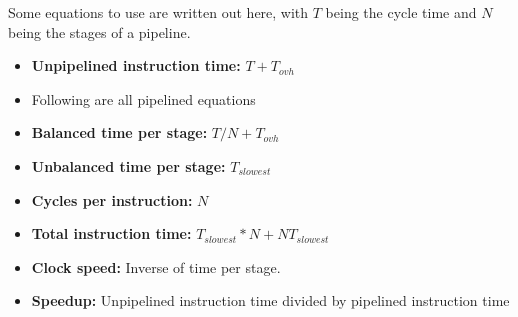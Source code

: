 \documentclass{article}
\theoremstyle{remark}
\begin{document}
Some equations to use are written out here, with \(T\) being the cycle time and \(N\) being the stages of a pipeline.
\begin{itemize}
    \item \textbf{Unpipelined instruction time:} \(T + T_{ovh}\)
    \item Following are all pipelined equations
    \item \textbf{Balanced time per stage:} \(T/N + T_{ovh}\)
    \item \textbf{Unbalanced time per stage:} \(T_{slowest}\)
    \item \textbf{Cycles per instruction:} \(N\)
    \item \textbf{Total instruction time:} \(T_{slowest} * N + N T_{slowest}\)
    \item \textbf{Clock speed:} Inverse of time per stage.
    \item \textbf{Speedup:} Unpipelined instruction time divided by pipelined instruction time
\end{itemize}
\end{document}

